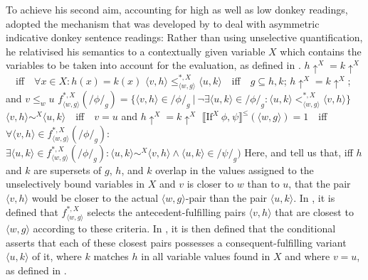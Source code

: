 To achieve his second aim, accounting for high as well as low donkey readings, \textcite{vanRooij2006} adopted the mechanism that was developed by \textcite{Root1986} to deal with asymmetric indicative donkey sentence readings: Rather than using unselective quantification, he relativised his semantics to a contextually given variable $X$ which contains the variables to be taken into account for the evaluation, as defined in .
\pex\label{def:rooij-relative}
\a $h\uparrow^X=k\uparrow^X$~~iff~~$\forall{x\in X}:h(x)=k(x)$
\a $\langle v,h\rangle\leqslant^{*,X}_{\langle w,g\rangle}\langle u,k\rangle$~~iff~~$g\subseteq h,k$; $h\uparrow^{X}=k\uparrow^{X}$; and $v\leqslant_w u$
\a $f^{*,X}_{\langle w,g\rangle}(/\phi/_g)=\{\langle v,h\rangle\in/\phi/_g~|~\neg\exists\langle u,k\rangle\in/\phi/_g:\langle u,k\rangle<^{*,X}_{\langle w,g\rangle}\langle v,h\rangle\}$
\a $\langle v,h\rangle\sim^X\langle u,k\rangle$~~iff~~$v=u$ and $h\uparrow^X=k\uparrow^X$
\a $\llbracket\text{If}^{X}~\phi\text{,}~\psi\rrbracket^\leqslant(\langle w,g\rangle)=1$~~iff~~$\forall{\langle v,h\rangle\in f^{*,X}_{\langle w,g\rangle}(/\phi/_g)}:$\\\emptyfill$\exists\langle u,k\rangle\in f^{*,X}_{\langle w,g\rangle}(/\phi/_g):\langle u,k\rangle\sim^X\langle v,h\rangle\land\langle u,k\rangle\in/\psi/_g)$
\xe
Here,  and  tell us that, iff $h$ and $k$ are supersets of $g$, $h$, and $k$ overlap in the values assigned to the unselectively bound variables in $X$ and $v$ is closer to $w$ than to $u$, that the pair $\langle v,h\rangle$ would be closer to the actual $\langle w,g\rangle$-pair than the pair $\langle u,k\rangle$. In , it is defined that $f^{*,X}_{\langle w,g\rangle}$ selects the antecedent-fulfilling pairs $\langle v,h\rangle$ that are closest to $\langle w,g\rangle$ according to these criteria. In , it is then defined that the conditional asserts that each of these closest pairs possesses a consequent-fulfilling variant $\langle u,k\rangle$ of it, where $k$ matches $h$ in all variable values found in $X$ and where $v=u$, as defined in .

